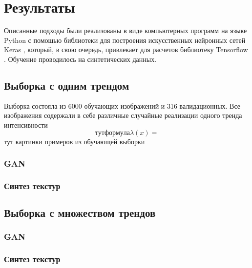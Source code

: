 \section{Результаты}
	Описанные подходы были реализованы в виде компьютерных программ на языке Python с помощью библиотеки для построения искусственных нейронных сетей Keras \cite{keras}, который, в свою очередь, привлекает для расчетов библиотеку Tensorflow \cite{tf}. Обучение проводилось на синтетических данных. 
	\subsection{Выборка с одним трендом}
		Выборка состояла из 6000 обучающих изображений и 316 валидационных. Все изображения содержали в себе различные случайные реализации одного тренда интенсивности
		$$тут формула \lambda(x) = $$
		тут картинки примеров из обучающей выборки
		\subsubsection{GAN}
		\subsubsection{Синтез текстур}
	\subsection{Выборка с множеством трендов}
		\subsubsection{GAN}
		\subsubsection{Синтез текстур}